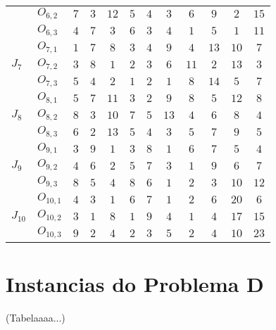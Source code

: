 \begin{table}[htb]
\begin{tabular}[t]{llcccccccccc}
    &$O_{6,2}$ & $7$ & $3$ & $12$ & $5$ & $4$ & $3$ & $6$ & $9$ & $2$ & $15$\\
    &$O_{6,3}$ & $4$ & $7$ & $3$ & $6$ & $3$ & $4$ & $1$ & $5$ & $1$ & $11$\\
    \multirow{3}{*}{$J_7$}&$O_{7,1}$ & $1$ & $7$ & $8$ & $3$ & $4$ & $9$ & $4$ & $13$ & $10$ & $7$\\
    &$O_{7,2}$ & $3$ & $8$ & $1$ & $2$ & $3$ & $6$ & $11$ & $2$ & $13$ & $3$\\
    &$O_{7,3}$ & $5$ & $4$ & $2$ & $1$ & $2$ & $1$ & $8$ & $14$ & $5$ & $7$\\
    \multirow{3}{*}{$J_8$}&$O_{8,1}$ & $5$ & $7$ & $11$ & $3$ & $2$ & $9$ & $8$ & $5$ & $12$ & $8$\\
    &$O_{8,2}$ & $8$ & $3$ & $10$ & $7$ & $5$ & $13$ & $4$ & $6$ & $8$ & $4$\\
    &$O_{8,3}$ & $6$ & $2$ & $13$ & $5$ & $4$ & $3$ & $5$ & $7$ & $9$ & $5$\\
    \multirow{3}{*}{$J_9$}&$O_{9,1}$ & $3$ & $9$ & $1$ & $3$ & $8$ & $1$ & $6$ & $7$ & $5$ & $4$\\
    &$O_{9,2}$ & $4$ & $6$ & $2$ & $5$ & $7$ & $3$ & $1$ & $9$ & $6$ & $7$\\
    &$O_{9,3}$ & $8$ & $5$ & $4$ & $8$ & $6$ & $1$ & $2$ & $3$ & $10$ & $12$\\
    \multirow{3}{*}{$J_{10}$}&$O_{10,1}$ & $4$ & $3$ & $1$ & $6$ & $7$ & $1$ & $2$ & $6$ & $20$ & $6$\\
    &$O_{10,2}$ & $3$ & $1$ & $8$ & $1$ & $9$ & $4$ & $1$ & $4$ & $17$ & $15$\\
    &$O_{10,3}$ & $9$ & $2$ & $4$ & $2$ & $3$ & $5$ & $2$ & $4$ & $10$ & $23$\\
    \hline
    \end{tabular}
\end{table}
\section{Instancias do Problema D}
\label{apd:problem-instance-d}
    (Tabelaaaa...)


